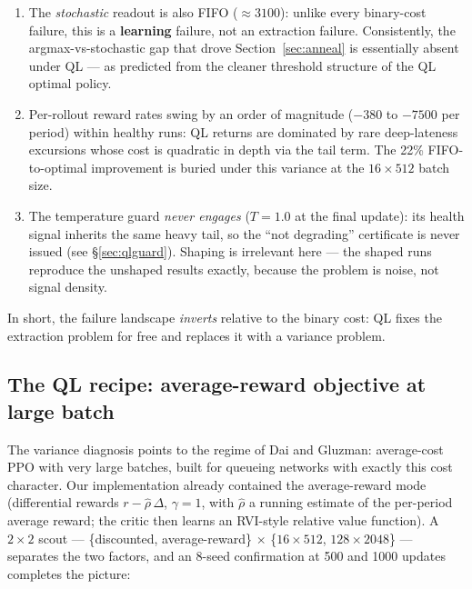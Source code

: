 \documentclass[11pt,a4paper]{article}
\begin{document}
\begin{enumerate}
  \item The \emph{stochastic} readout is also FIFO ($\approx 3100$):
  unlike every binary-cost failure, this is a \textbf{learning} failure,
  not an extraction failure.  Consistently, the argmax-vs-stochastic gap
  that drove Section~\ref{sec:anneal} is essentially absent under QL ---
  as predicted from the cleaner threshold structure of the QL optimal
  policy.
  \item Per-rollout reward rates swing by an order of magnitude
  ($-380$ to $-7500$ per period) within healthy runs: QL returns are
  dominated by rare deep-lateness excursions whose cost is quadratic in
  depth via the tail term.  The 22\% FIFO-to-optimal improvement is
  buried under this variance at the $16 \times 512$ batch size.
  \item The temperature guard \emph{never engages} ($T = 1.0$ at the
  final update): its health signal inherits the same heavy tail, so the
  ``not degrading'' certificate is never issued (see
  \S\ref{sec:qlguard}).  Shaping is irrelevant here --- the shaped runs
  reproduce the unshaped results exactly, because the problem is noise,
  not signal density.
\end{enumerate}

In short, the failure landscape \emph{inverts} relative to the binary
cost: QL fixes the extraction problem for free and replaces it with a
variance problem.

\subsection{The QL recipe: average-reward objective at large batch}
\label{sec:qlrecipe}

The variance diagnosis points to the regime of Dai and Gluzman:
average-cost PPO with very large batches, built for queueing networks
with exactly this cost character.  Our implementation already contained
the average-reward mode (differential rewards $r - \hat\rho\,\Delta$,
$\gamma = 1$, with $\hat\rho$ a running estimate of the per-period
average reward; the critic then learns an RVI-style relative value
function).  A $2 \times 2$ scout --- \{discounted, average-reward\}
$\times$ \{$16 \times 512$, $128 \times 2048$\} --- separates the two
factors, and an 8-seed confirmation at 500 and 1000 updates completes the
picture:
\end{document}
